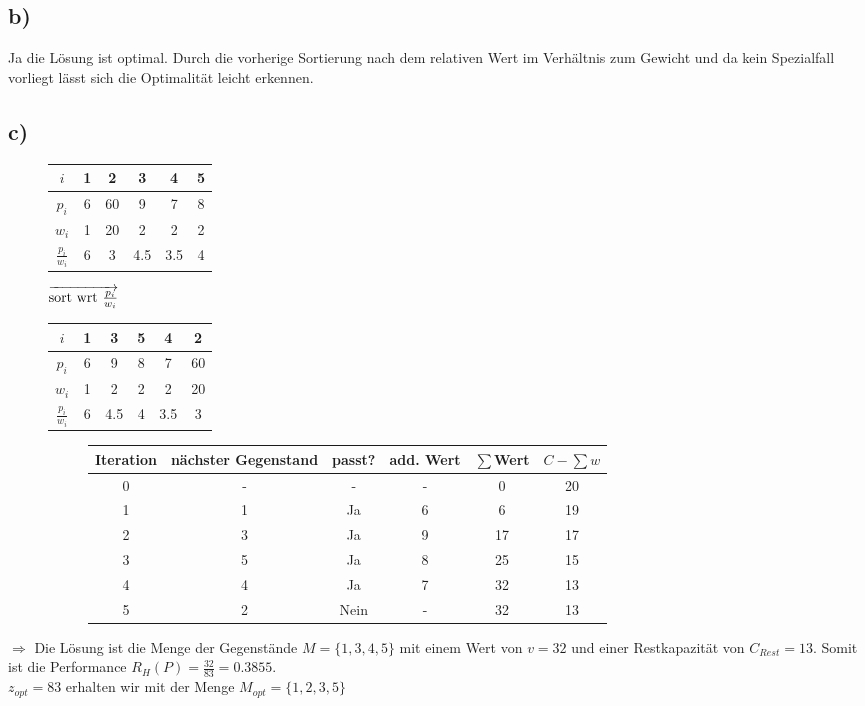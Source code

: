 \documentclass[12pt]{article}
\begin{document}
	\subsection{b)} 
	Ja die Lösung ist optimal. Durch die vorherige Sortierung nach dem relativen Wert im Verhältnis zum Gewicht und da kein Spezialfall vorliegt lässt sich die Optimalität leicht erkennen.
	
	\subsection{c)}
	\begin{figure}[H]
		\centering
		\begin{tabular}{c | c c c c c}
			$i$ & 1 & 2 & 3 & 4 & 5 \\ \hline
			$p_i$ & 6 & 60 & 9 & 7 & 8 \\
			$w_i$ & 1 & 20 & 2 & 2 & 2 \\
			$\frac{p_i}{w_i}$ & 6 & 3 & 4.5 & 3.5 & 4 \\
		\end{tabular}
		$\overrightarrow{$sort wrt $\frac{p_i}{w_i}}$
		\begin{tabular}{c | c c c c c}
			$i$ 				& 1 & 3   & 5 & 4  & 2  \\ \hline
			$p_i$ 				& 6 & 9   & 8 & 7  & 60 \\
			$w_i$ 				& 1 & 2   & 2 & 2  & 20 \\
			$\frac{p_i}{w_i}$ 	& 6 & 4.5 & 4 & 3.5& 3  \\
		\end{tabular}
	
		\begin{figure}[H]
			\centering
			\begin{tabular}{c | c c c c c}
				Iteration & nächster Gegenstand & passt? & add. Wert & $\sum$Wert & $C-\sum w$ \\ \hline
				0 & - & - & - & 0 & 20 \\
				1 & 1 & Ja & 6 & 6 & 19 \\
				2 & 3 & Ja & 9 & 17 & 17 \\
				3 & 5 & Ja & 8 & 25 & 15 \\
				4 & 4 & Ja & 7 & 32 & 13 \\
				5 & 2 & Nein & - & 32 & 13 \\
			\end{tabular}			
		\end{figure}
	\end{figure}
	$\Rightarrow$ Die Lösung ist die Menge der Gegenstände $M=\{1 ,3 ,4, 5\}$ mit einem Wert von $v=32$ und einer Restkapazität von $C_{Rest}=13$. Somit ist die Performance $R_H(P)=\frac{32}{83}=0.3855$.\\ $z_{opt}=83$ erhalten wir mit der Menge $M_{opt}=\{1, 2, 3, 5\}$
\end{document}
